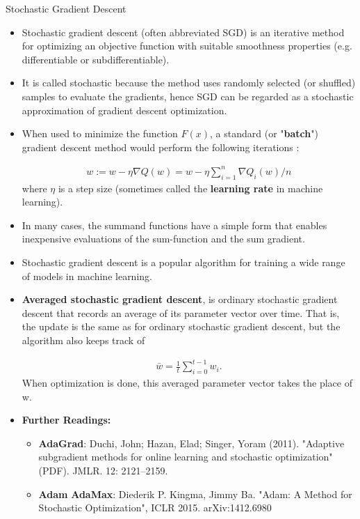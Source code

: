 \documentclass[10pt]{beamer}
\begin{document}
\begin{frame}[allowframebreaks]{Stochastic Gradient Descent}
  \begin{itemize}
  \item Stochastic gradient descent (often abbreviated SGD) is an iterative method for
    optimizing an objective function with suitable smoothness properties
    (e.g. differentiable or subdifferentiable).
  \item It is called stochastic because the method uses randomly selected (or shuffled)
    samples to evaluate the gradients, hence SGD can be regarded as a stochastic
    approximation of gradient descent optimization.

  \item When used to minimize the function $F(x)$, a standard (or "\textbf{batch}") gradient
    descent method would perform the following iterations :

    \begin{align*}
    w:=w-\eta \nabla Q(w)=w-\eta \sum _{i=1}^{n}\nabla Q_{i}(w)/n
    \end{align*}
    where $\eta$  is a step size (sometimes called the \textbf{learning rate} in machine learning).
  \item In many cases, the summand functions have a simple form that enables inexpensive
    evaluations of the sum-function and the sum gradient.
  \item Stochastic gradient descent is a popular algorithm for training a wide range of models in machine learning.

  \item \textbf{Averaged stochastic gradient descent}, is ordinary stochastic gradient descent that
    records an average of its parameter vector over time. That is, the update is the same
    as for ordinary stochastic gradient descent, but the algorithm also keeps track of

    \begin{align*}
    {\bar {w}}={\frac {1}{t}}\sum _{i=0}^{t-1}w_{i}.
    \end{align*}
    When optimization is done, this averaged parameter vector takes the place of w.
\newpage
  \item\textbf{ Further Readings:}

    \begin{itemize}
    \item \textbf{AdaGrad}: Duchi, John; Hazan, Elad; Singer, Yoram (2011). "Adaptive subgradient
      methods for online learning and stochastic optimization" (PDF). JMLR. 12: 2121–2159.
    \item \textbf{Adam} \textbf{AdaMax}: Diederik P. Kingma, Jimmy Ba. "Adam: A Method for Stochastic
      Optimization", ICLR 2015. arXiv:1412.6980

    \end{itemize}

  \end{itemize}

\end{frame}
\end{document}
